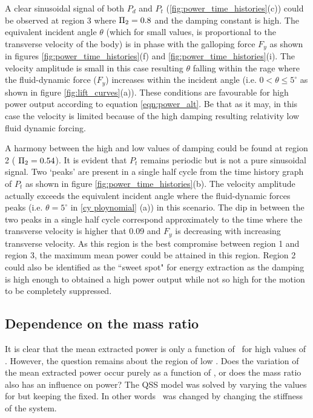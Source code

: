 A clear sinusoidal signal of both $P_d$ and $P_t$ (\ref{fig:power_time_histories}(c)) could be observed at region 3 where $\Pi_2=0.8$ and the damping constant is high. The equivalent incident angle $\theta$ (which for small values, is proportional to the transverse velocity of the body) is in phase with the galloping force $F_y$ as shown in figures \ref{fig:power_time_histories}(f) and  \ref{fig:power_time_histories}(i). The velocity amplitude is small in this case resulting $\theta$ falling within the rage where the fluid-dynamic force ($F_y$) increases within the incident angle (i.e. $0<\theta \leq 5^\circ$ as shown in figure \ref{fig:lift_curves}(a)). These conditions are favourable for high power output according to equation \ref{eqn:power_alt}. Be that as it may, in this case the velocity is limited because of the high damping resulting relativity low fluid dynamic forcing. 

A harmony between the high and low values of damping could be found at region 2  ( $\Pi_2=0.54$). It is evident that $P_t$ remains periodic but is not a pure sinusoidal signal. Two `peaks' are present in a single half cycle from the time history graph of $P_t$ as shown in figure \ref{fig:power_time_histories}(b). The velocity amplitude actually exceeds the equivalent incident angle where the fluid-dynamic forces peaks (i.e. $\theta=5^\circ$ in \ref{cy ploynomial} (a)) in this scenario. The dip in between the two peaks in a single half cycle correspond approximately to the time where the transverse velocity is higher that 0.09 and $F_y$ is decreasing with increasing transverse velocity. As this region is the best compromise between region 1 and region 3, the maximum mean power could be attained in this region. Region 2 could also be identified as the ``sweet spot" for energy extraction as the damping is high enough to obtained a high power output while not so high for the motion to be completely suppressed. 


\subsection{Dependence on the mass ratio \mstar}
\label{sec:chp-pi_1_pi2_mstar}


It is clear that the mean extracted power is only a function of \massdamp \ for high values of \massstiff. However, the question remains about the region of low \massstiff. Does the variation of the mean extracted power occur purely as a function of \massstiff, or does the mass ratio also has an influence on power? The QSS model was solved by varying the values for \mstar
but keeping the \massstiff fixed. In other words \massstiff\ was changed by changing the stiffness of the system. 
 
